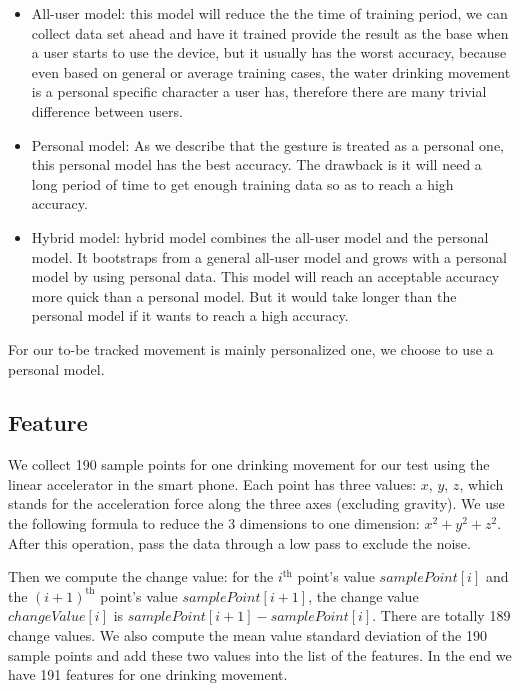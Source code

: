 \documentclass[12pt,twocolumn]{article}
\begin{document}
\begin{itemize}
	\item All-user model: this model will reduce the the time of training period, we can collect data set ahead and have it trained provide the result as the base when a user starts to use the device, but it usually has the worst accuracy, because even based on general or average training cases, the water drinking movement is a personal specific character a user has, therefore there are many trivial difference between users.
	\item Personal model: As we describe that the gesture is treated as a personal one, this personal model has the best accuracy. The drawback is it will need a long period of time to get enough training data so as to reach a high accuracy.
	\item Hybrid model: hybrid model combines the all-user model and the personal model. It bootstraps from a general all-user model and grows with a personal model by using personal data. This model will reach an acceptable accuracy more quick than a personal model. But it would take longer than the personal model if it wants to reach a high accuracy.
\end{itemize}

For our to-be tracked movement is mainly personalized one, we choose to use a personal model\cite{LiKamWa:2013:MBM:2462456.2464449}.

\subsection{Feature}
We collect 190 sample points for one drinking movement for our test using the linear accelerator in the smart phone. Each point has three values: $x$, $y$, $z$, which stands for the acceleration force along the three axes (excluding gravity). We use the following formula to reduce the 3 dimensions to one dimension: $x^2+y^2+z^2$. After this operation, pass the data through a low pass to exclude the noise.

Then we compute the change value: for the $i^{\text{th}}$ point's value $samplePoint[i]$ and the $(i+1)^{\text{th}}$ point's value $samplePoint[i+1]$, the change value $changeValue[i]$ is $samplePoint[i+1] - samplePoint[i]$. There are totally 189 change values. We also compute the mean value standard deviation of the 190 sample points and add these two values into the list of the features. In the end we have 191 features for one drinking movement\cite{Jain}.
\end{document}
